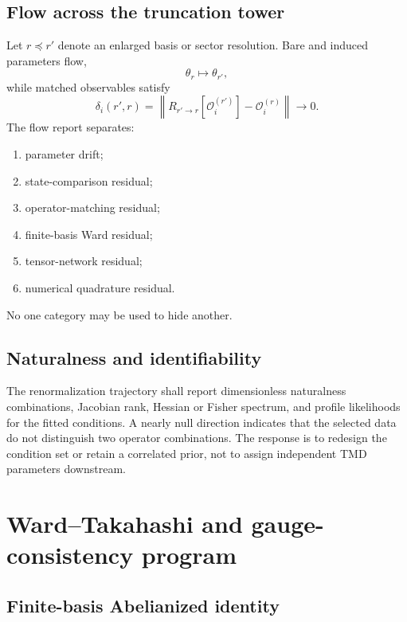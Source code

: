 \documentclass[11pt]{article}
\newcommand{\cO}{\mathcal O}
\newcommand{\norm}[1]{\left\lVert#1\right\rVert}
\begin{document}
\subsection{Flow across the truncation tower}

Let \(r\preceq r'\) denote an enlarged basis or sector resolution.  Bare and
induced parameters flow,
\begin{equation}
 \theta_r\longmapsto\theta_{r'},
\end{equation}
while matched observables satisfy
\begin{equation}
 \delta_i(r',r)
 =
 \norm{
 R_{r'\to r}[\cO_i^{(r')}]
 -\cO_i^{(r)}
 }
 \longrightarrow0.
 \label{eq:observable-flow}
\end{equation}
The flow report separates:
\begin{enumerate}
 \item parameter drift;
 \item state-comparison residual;
 \item operator-matching residual;
 \item finite-basis Ward residual;
 \item tensor-network residual;
 \item numerical quadrature residual.
\end{enumerate}
No one category may be used to hide another.

\subsection{Naturalness and identifiability}

The renormalization trajectory shall report dimensionless naturalness
combinations, Jacobian rank, Hessian or Fisher spectrum, and profile
likelihoods for the fitted conditions.  A nearly null direction indicates that
the selected data do not distinguish two operator combinations.  The response
is to redesign the condition set or retain a correlated prior, not to assign
independent TMD parameters downstream.

\section{Ward--Takahashi and gauge-consistency program}

\subsection{Finite-basis Abelianized identity}
\end{document}

